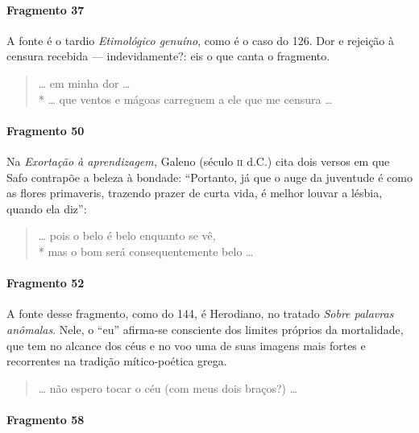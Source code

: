 {\paragraph{Fragmento 37}

{\small A fonte é o tardio \textit{Etimológico genuíno}, como é o caso do 126. Dor e
rejeição à censura recebida --- indevidamente?: eis o que canta o fragmento.}

\begin{verse}
\ldots{} em minha dor \ldots{}\\*
\ldots{} que ventos e mágoas carreguem a ele que me censura \ldots{}
\end{verse}

\paragraph{Fragmento 50}

{\small Na \textit{Exortação à aprendizagem, }Galeno (século \textsc{ii} d.C.) cita dois versos
em que Safo contrapõe a beleza à bondade: ``Portanto, já que o auge da
juventude é como as flores primaveris, trazendo prazer de curta vida, é melhor
louvar a lésbia, quando ela diz'':}

\begin{verse}
\ldots{} pois o belo é belo enquanto se vê,\\*
mas o bom será consequentemente belo \ldots{}
\end{verse}

\paragraph{Fragmento 52}

{\small A fonte desse fragmento, como do 144, é Herodiano, no tratado \textit{Sobre
palavras anômalas}. Nele, o “eu” afirma-se consciente dos limites próprios da
mortalidade, que tem no alcance dos céus e no voo uma de suas imagens mais
fortes e recorrentes na tradição mítico-poética grega.}

\begin{verse}
\ldots{} não espero tocar o céu (com meus dois braços?) \ldots{}
\end{verse}

\paragraph{Fragmento 58}

}
